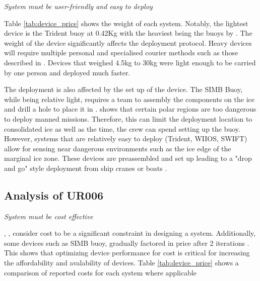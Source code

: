 \textit{System must be  user-friendly and easy to deploy}

Table \ref{tab:device_price} shows the weight of each system. Notably, the lightest device is the  Trident buoy at 0.42Kg with the heaviest being the buoys by \textcite{doble2017robust}. The weight of the device significantly affects the deployment protocol. Heavy devices will require multiple personal and specialised courier methods such as those described in \textcite{doble2017robust}. Devices that weighed 4.5kg to 30kg were light enough to be carried by one person and deployed much faster.

The deployment is also affected by the set up of the device. The SIMB Buoy, while being relative light, requires a team to assembly the components on the ice and drill a hole to place it in \cite{PLANCK2019102792}. \textcite{kennicutt2016delivering} shows that certain polar regions are too dangerous to deploy manned missions. Therefore, this can limit the deployment location to consolidated ice as well as the time, the crew can spend setting up the buoy. However, systems that are relatively easy to deploy (Trident, WIIOS, SWIFT) allow for sensing near dangerous environments such as the ice edge of the marginal ice zone. These devices are preassembled and set up leading to a "drop and go" style deployment from ship cranes \cite{vichi2019effects} \cite{alberello2019drift} or boats \cite{rabault2019open} \cite{kohout2015device}.

\subsection{Analysis of UR006}

\textit{System must be cost effective}

\textcite{PLANCK2019102792}, \textcite{guimaraes2018surface}, \textcite{rabault2019open} consider cost to be a significant constraint in designing a system. Additionally, some devices such as SIMB buoy, gradually factored in price after 2 iterations \cite{planck2019evolution}. This shows that optimizing device performance for cost is critical for increasing the affordability and avalability of devices. Table \ref{tab:device_price} shows a comparison of reported costs for each system where applicable 

